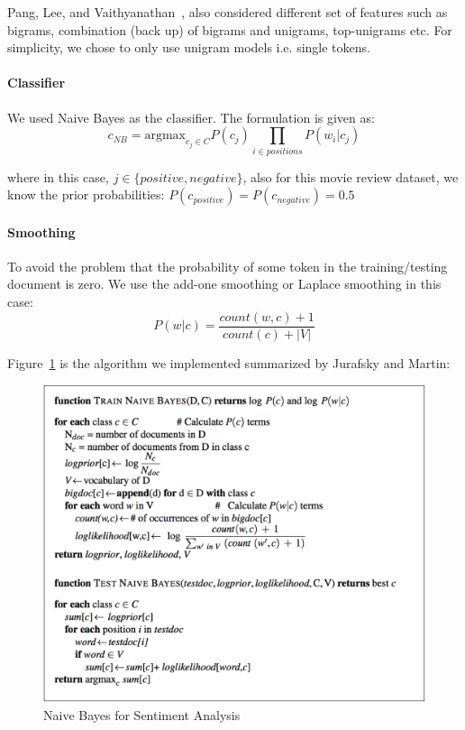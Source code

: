 Pang, Lee, and 
Vaithyanathan~\cite{hid-sp18-405-sentiment-pang2002thumbs}, also 
considered different set of 
features such as bigrams, combination (back up) of bigrams and unigrams, 
top-unigrams etc. For simplicity, we chose to only use unigram models i.e. 
single tokens. 

\paragraph{Classifier}
We  used Naive Bayes as the classifier. The formulation is given as:
\begin{equation}\label{eq:nb}
c_{NB}=\text{argmax}_{c_j \in C} P(c_j) \prod_{i \in positions} P(w_i|c_j)
\end{equation}

where in this case, $j \in \{positive, negative\}$, also for this movie review 
dataset, we know the prior probabilities: 
$P(c_{positive})=P(c_{negative})=0.5$

\paragraph{Smoothing}
To avoid the problem that the probability of some token in the 
training/testing document is zero. We use the add-one smoothing or Laplace 
smoothing in this case:
\begin{equation}\label{eq:sm}
P(w|c) = \frac{count(w,c) + 1}{count(c) + |V|}
\end{equation}

Figure~\ref{f:algo} is the algorithm we implemented summarized by Jurafsky 
and Martin:
\begin{figure}[!ht]
		\centering\includegraphics[width=\columnwidth]{images/algorithm.png}
		\caption{Naive Bayes for Sentiment 
		Analysis~\cite{hid-sp18-405-sentiment-jurafsky2009}}\label{f:algo}
\end{figure}

